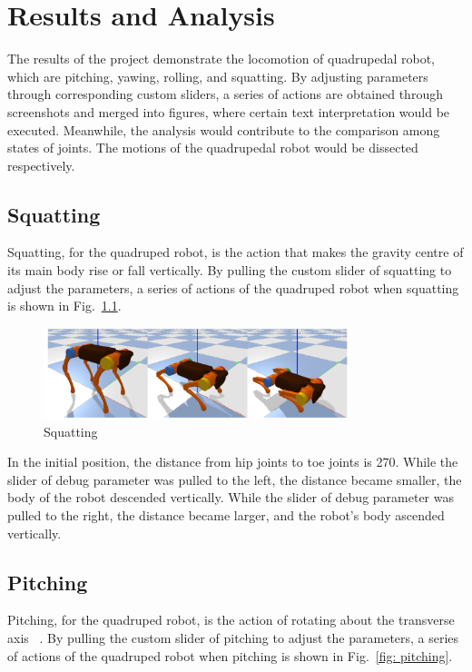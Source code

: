 \chapter{Results and Analysis}

The results of the project demonstrate the locomotion of quadrupedal robot, which are pitching, yawing, rolling, and squatting. By adjusting parameters through corresponding custom sliders, a series of actions are obtained through screenshots and merged into figures, where certain text interpretation would be executed. Meanwhile, the analysis would contribute to the comparison among states of joints. The motions of the quadrupedal robot would be dissected respectively.  


\section{Squatting}

Squatting, for the quadruped robot, is the action that makes the gravity centre of its main body rise or fall vertically. By pulling the custom slider of squatting to adjust the parameters, a series of actions of the quadruped robot when squatting is shown in Fig.~\ref{fig: squatting}.

\begin{figure}[htbp]
    \centering
    \includegraphics[width=0.8\textwidth]{figures/squatting.png}
    \caption{Squatting}
    \label{fig: squatting}
\end{figure}

In the initial position, the distance from hip joints to toe joints is 270. While the slider of debug parameter was pulled to the left, the distance became smaller, the body of the robot descended vertically. While the slider of debug parameter was pulled to the right, the distance became larger, and the robot's body ascended vertically.


\section{Pitching}

Pitching, for the quadruped robot, is the action of rotating about the transverse axis ~\cite{ref:6DOF}. By pulling the custom slider of pitching to adjust the parameters, a series of actions of the quadruped robot when pitching is shown in Fig.~\ref{fig: pitching}.

